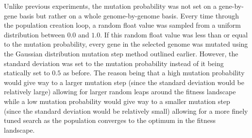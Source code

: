 \vspace{3mm}

Unlike previous experiments, the mutation probability was not set on a gene-by-gene basis but rather on a whole genome-by-genome basis. Every time through the population creation loop, a random float value was sampled from a uniform distribution between $0.0$ and $1.0$. If this random float value was less than or equal to the mutation probability, every gene in the selected genome was mutated using the Gaussian distribution mutation step method outlined earlier. However, the standard deviation was set to the mutation probability instead of it being statically set to $0.5$ as before. The reason being that a high mutation probability would give way to a larger mutation step (since the standard deviation would be relatively large) allowing for larger random leaps around the fitness landscape while a low mutation probability would give way to a smaller mutation step (since the standard deviation would be relatively small) allowing for a more finely tuned search as the population converges to the optimum in the fitness landscape.

